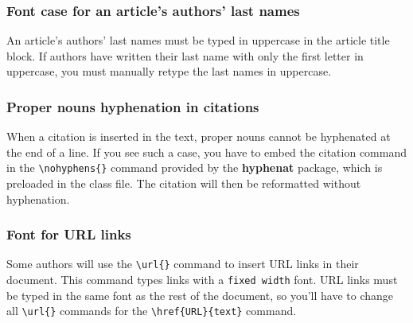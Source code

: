 \documentclass[english]{article}
\newcommand{\cmd}[1]{%
	\texttt{\textbackslash#1\{\}}
}
\begin{document}
			\subsubsection{Font case for an article's authors' last names}
			
			An article's authors' last names must be typed in uppercase in the article title block. If authors
			have written their last name with only the first letter in uppercase, you must manually retype
			the last names in uppercase.
			
			\subsubsection{Proper nouns hyphenation in citations}
			
			When a citation is inserted in the text, proper nouns cannot be hyphenated at the end of a
			line. If you see such a case, you have to embed the citation command in the
			\cmd{nohyphens} command provided by the \textbf{hyphenat} package, which is preloaded in the
			class file. The citation will then be reformatted without hyphenation.
			
			\subsubsection{Font for URL links} 
			
			Some authors will use the \cmd{url} command to insert URL links in their document. This command
			types links with a \texttt{fixed width} font. URL links must be typed in the same font as the rest
			of the document, so you'll have to change all \cmd{url} commands for the \verb|\href{URL}{text}| 
			command.
			
\end{document}
